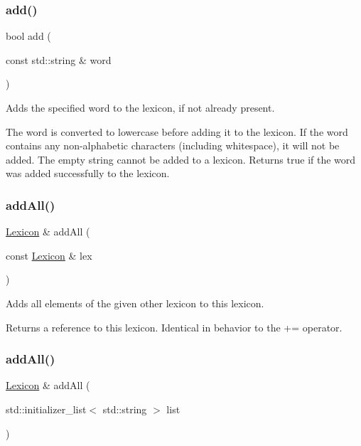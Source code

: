 \subsubsection{\texorpdfstring{add()}{add()}}
{\footnotesize\ttfamily bool add (\begin{DoxyParamCaption}\item[{const std\+::string \&}]{word }\end{DoxyParamCaption})}



Adds the specified word to the lexicon, if not already present. 

The word is converted to lowercase before adding it to the lexicon. If the word contains any non-\/alphabetic characters (including whitespace), it will not be added. The empty string cannot be added to a lexicon. Returns true if the word was added successfully to the lexicon. \mbox{\label{classLexicon_a9d62d8dcb351ae40c8a2220a9871348b}} 
\subsubsection{\texorpdfstring{add\+All()}{addAll()}\hspace{0.1cm}{\footnotesize\ttfamily [1/2]}}
{\footnotesize\ttfamily \mbox{\hyperlink{classLexicon}{Lexicon}} \& add\+All (\begin{DoxyParamCaption}\item[{const \mbox{\hyperlink{classLexicon}{Lexicon}} \&}]{lex }\end{DoxyParamCaption})}



Adds all elements of the given other lexicon to this lexicon. 

Returns a reference to this lexicon. Identical in behavior to the += operator. \mbox{\label{classLexicon_a554e59039648403990042d16710855e0}} 
\subsubsection{\texorpdfstring{add\+All()}{addAll()}\hspace{0.1cm}{\footnotesize\ttfamily [2/2]}}
{\footnotesize\ttfamily \mbox{\hyperlink{classLexicon}{Lexicon}} \& add\+All (\begin{DoxyParamCaption}\item[{std\+::initializer\+\_\+list$<$ std\+::string $>$}]{list }\end{DoxyParamCaption})}



